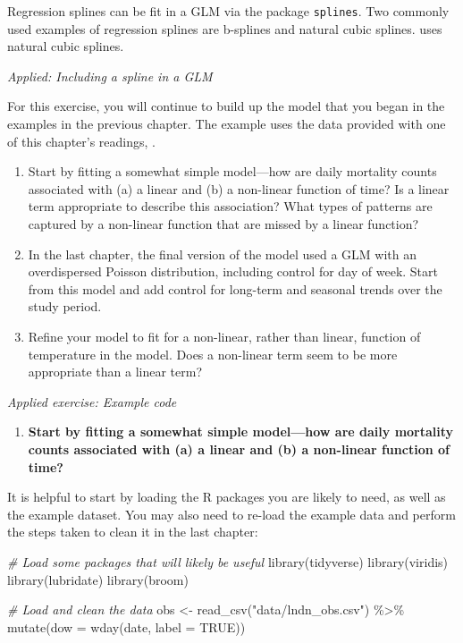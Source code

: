 \documentclass[
]{book}
\newenvironment{Shaded}{\begin{snugshade}}{\end{snugshade}}
\newcommand{\AttributeTok}[1]{\textcolor[rgb]{0.77,0.63,0.00}{#1}}
\newcommand{\CommentTok}[1]{\textcolor[rgb]{0.56,0.35,0.01}{\textit{#1}}}
\newcommand{\ConstantTok}[1]{\textcolor[rgb]{0.00,0.00,0.00}{#1}}
\newcommand{\FunctionTok}[1]{\textcolor[rgb]{0.00,0.00,0.00}{#1}}
\newcommand{\NormalTok}[1]{#1}
\newcommand{\OtherTok}[1]{\textcolor[rgb]{0.56,0.35,0.01}{#1}}
\newcommand{\SpecialCharTok}[1]{\textcolor[rgb]{0.00,0.00,0.00}{#1}}
\newcommand{\StringTok}[1]{\textcolor[rgb]{0.31,0.60,0.02}{#1}}
\providecommand{\tightlist}{%
  \setlength{\itemsep}{0pt}\setlength{\parskip}{0pt}}
\begin{document}
Regression splines can be fit in a GLM via the package \texttt{splines}. Two commonly
used examples of regression splines are b-splines and natural cubic
splines. \citet{vicedo2019hands} uses natural cubic splines.

\emph{Applied: Including a spline in a GLM}

For this exercise, you will continue to build up the model that you began in
the examples in the previous chapter. The example uses the data provided with
one of this chapter's readings, \citet{vicedo2019hands}.

\begin{enumerate}
\def\labelenumi{\arabic{enumi}.}
\tightlist
\item
  Start by fitting a somewhat simple model---how are daily mortality counts
  associated with (a) a linear and (b) a non-linear function of time? Is a linear
  term appropriate to describe this association? What types of patterns are
  captured by a non-linear function that are missed by a linear function?
\item
  In the last chapter, the final version of the model used a GLM with an
  overdispersed Poisson distribution, including control for day of week.
  Start from this model and add control for long-term and seasonal trends
  over the study period.
\item
  Refine your model to fit for a non-linear, rather than linear, function
  of temperature in the model. Does a non-linear term seem to be more
  appropriate than a linear term?
\end{enumerate}

\emph{Applied exercise: Example code}

\begin{enumerate}
\def\labelenumi{\arabic{enumi}.}
\tightlist
\item
  \textbf{Start by fitting a somewhat simple model---how are daily mortality counts
  associated with (a) a linear and (b) a non-linear function of time?}
\end{enumerate}

It is helpful to start by loading the R packages you are likely to need, as
well as the example dataset. You may also need to re-load the example data
and perform the steps taken to clean it in the last chapter:

\begin{Shaded}
\begin{Highlighting}[]
\CommentTok{\# Load some packages that will likely be useful}
\FunctionTok{library}\NormalTok{(tidyverse)}
\FunctionTok{library}\NormalTok{(viridis)}
\FunctionTok{library}\NormalTok{(lubridate)}
\FunctionTok{library}\NormalTok{(broom)}

\CommentTok{\# Load and clean the data}
\NormalTok{obs }\OtherTok{\textless{}{-}} \FunctionTok{read\_csv}\NormalTok{(}\StringTok{"data/lndn\_obs.csv"}\NormalTok{) }\SpecialCharTok{\%\textgreater{}\%} 
  \FunctionTok{mutate}\NormalTok{(}\AttributeTok{dow =} \FunctionTok{wday}\NormalTok{(date, }\AttributeTok{label =} \ConstantTok{TRUE}\NormalTok{))}
\end{Highlighting}
\end{Shaded}
\end{document}
